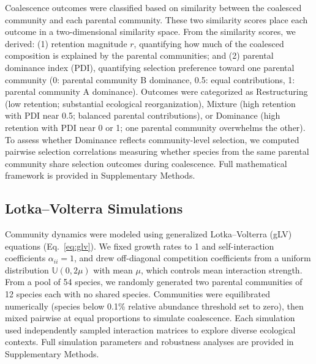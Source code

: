 Coalescence outcomes were classified based on similarity between the coalesced community and each parental community.  These two similarity scores place each outcome in a two-dimensional similarity space. From the similarity scores, we derived: (1) retention magnitude $r$, quantifying how much of the coalesced composition is explained by the parental communities; and (2) parental dominance index (PDI), quantifying selection preference toward one parental community (0: parental community B dominance, 0.5: equal contributions, 1: parental community A dominance).  Outcomes were categorized as Restructuring (low retention; substantial ecological reorganization), Mixture (high retention with PDI near 0.5; balanced parental contributions), or Dominance (high retention with PDI near 0 or 1; one parental community overwhelms the other). To assess whether Dominance reflects community-level selection, we computed pairwise selection correlations measuring whether species from the same parental community share selection outcomes during coalescence. Full mathematical framework is provided in Supplementary Methods.


\subsection*{Lotka--Volterra Simulations}
\label{sec:methods:simulations}

Community dynamics were modeled using generalized Lotka--Volterra (gLV) equations (Eq.~\ref{eq:glv}). We fixed growth rates to 1 and self-interaction coefficients $\alpha_{ii} = 1$, and drew off-diagonal competition coefficients from a uniform distribution $\mathbb{U}(0, 2\mu)$ with mean $\mu$, which controls mean interaction strength. From a pool of 54 species, we randomly generated two parental communities of 12 species each with no shared species. Communities were equilibrated numerically (species below 0.1\% relative abundance threshold set to zero), then mixed pairwise at equal proportions to simulate coalescence. Each simulation used independently sampled interaction matrices to explore diverse ecological contexts. Full simulation parameters and robustness analyses are provided in Supplementary Methods.


